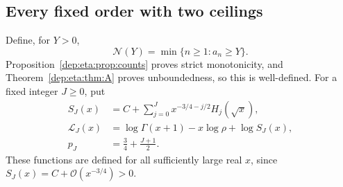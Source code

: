 \documentclass[11pt]{article}
\theoremstyle{definition}\newtheorem{definition}[theorem]{Definition}
\theoremstyle{remark}\newtheorem{remark}[theorem]{Remark}
\newcommand{\OO}{\mathcal O}
\begin{document}
\subsection{Every fixed order with two ceilings}
Define, for $Y>0$,
\begin{equation}\label{dep:eta:eq:threshold}
 \mathcal N(Y)=\min\{n\ge1:a_n\ge Y\}.
\end{equation}
Proposition~\ref{dep:eta:prop:counts} proves strict monotonicity, and
Theorem~\ref{dep:eta:thm:A} proves unboundedness, so this is well-defined.
For a fixed integer $J\ge0$, put
\begin{align}
 S_J(x)&=C+\sum_{j=0}^Jx^{-3/4-j/2}H_j(\sqrt x),\label{dep:eta:eq:SJ}\\
 \mathcal L_J(x)&=\log\Gamma(x+1)-x\log\rho+\log S_J(x),\label{dep:eta:eq:LJ}\\
 p_J&=\frac34+\frac{J+1}{2}.\label{dep:eta:eq:pJ}
\end{align}
These functions are defined for all sufficiently large real $x$,
since $S_J(x)=C+\OO(x^{-3/4})>0$.
\end{document}
